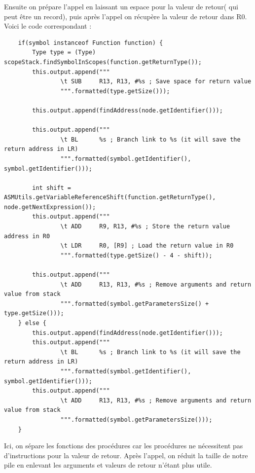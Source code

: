 \documentclass[french,a4paper]{article}
\begin{document}
    Ensuite on prépare l'appel en laissant un espace pour la valeur de retour( qui peut être un record), puis après l'appel on récupère la valeur de retour dans R0. Voici le code correspondant :
    \begin{lstlisting}
    if(symbol instanceof Function function) {
        Type type = (Type) scopeStack.findSymbolInScopes(function.getReturnType());
        this.output.append("""
                \t SUB     R13, R13, #%s ; Save space for return value
                """.formatted(type.getSize()));

        this.output.append(findAddress(node.getIdentifier()));

        this.output.append("""
                \t BL      %s ; Branch link to %s (it will save the return address in LR)
                """.formatted(symbol.getIdentifier(), symbol.getIdentifier()));

        int shift = ASMUtils.getVariableReferenceShift(function.getReturnType(), node.getNextExpression());
        this.output.append("""
                \t ADD     R9, R13, #%s ; Store the return value address in R0
                \t LDR     R0, [R9] ; Load the return value in R0
                """.formatted(type.getSize() - 4 - shift));

        this.output.append("""
                \t ADD     R13, R13, #%s ; Remove arguments and return value from stack
                """.formatted(symbol.getParametersSize() + type.getSize()));
    } else {
        this.output.append(findAddress(node.getIdentifier()));
        this.output.append("""
                \t BL      %s ; Branch link to %s (it will save the return address in LR)
                """.formatted(symbol.getIdentifier(), symbol.getIdentifier()));
        this.output.append("""
                \t ADD     R13, R13, #%s ; Remove arguments and return value from stack
                """.formatted(symbol.getParametersSize()));
    }
    \end{lstlisting}

    Ici, on sépare les fonctions des procédures car les procédures ne nécessitent pas d'instructions pour la valeur de retour. Après l'appel, on réduit la taille de notre pile en enlevant les arguments et valeurs de retour n'étant plus utile. \\
\end{document}
